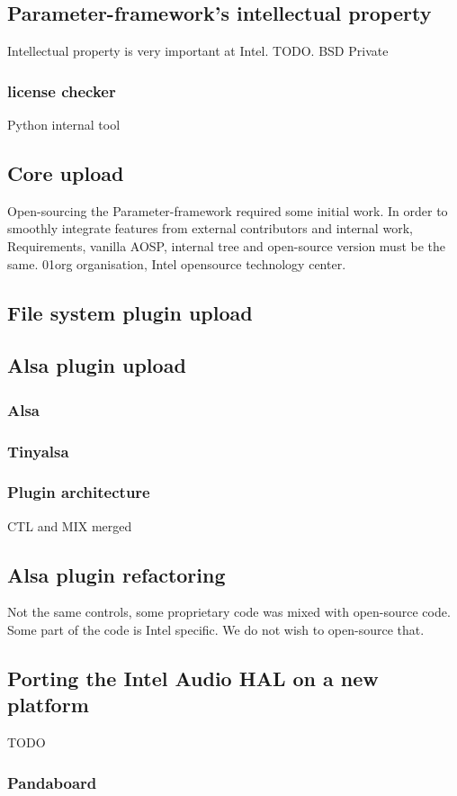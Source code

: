 \subsection{Parameter-framework's intellectual property}
Intellectual property is very important at Intel. TODO.
BSD
Private
\subsubsection{license checker}
Python internal tool

\subsection{Core upload}
Open-sourcing the Parameter-framework required some initial work.
In order to smoothly integrate features from external contributors and internal work,
Requirements, vanilla AOSP, internal tree and open-source version must be the
same.
01org organisation, Intel opensource technology center.


\subsection{File system plugin upload}

\subsection{Alsa plugin upload}
\subsubsection{Alsa}
\subsubsection{Tinyalsa}
\subsubsection{Plugin architecture}
CTL and MIX merged

\subsection{Alsa plugin refactoring}
Not the same controls, some proprietary code was mixed with open-source code.
Some part of the code is Intel specific. We do not wish to open-source that.

\subsection{Porting the Intel Audio HAL on a new platform}
TODO
\subsubsection{Pandaboard}

